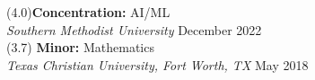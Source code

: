 
 	 (4.0)\hfill \textbf{Concentration:} AI/ML\\
\textit{Southern Methodist University}  \hfill December 2022\\

  (3.7) \hfill \textbf{Minor:} Mathematics\\
\textit{Texas Christian University, Fort Worth, TX}  \hfill May 2018\\